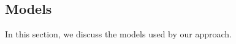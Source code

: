 \BLUE
\subsection{Models} 
\label{sec:models}

In this section, we discuss the models used by our approach.

\BLACK